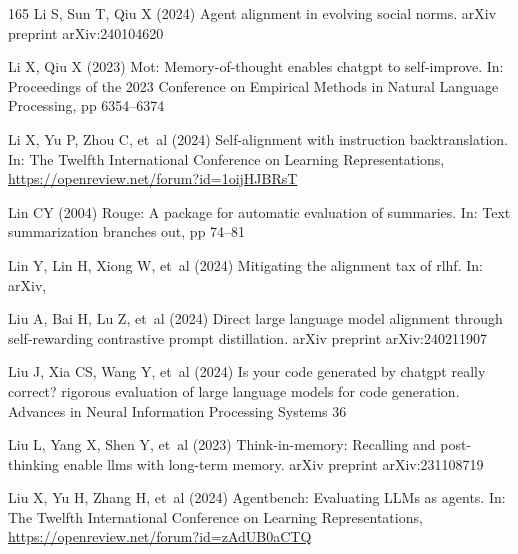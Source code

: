 \documentclass[sn-basic, Numbered]{sn-jnl}%
\theoremstyle{thmstyleone}%
\theoremstyle{thmstyletwo}%
\theoremstyle{thmstylethree}%
\begin{document}
\begin{thebibliography}{165}
Li S, Sun T, Qiu X (2024{}) Agent alignment in evolving social norms. arXiv preprint arXiv:240104620

Li X, Qiu X (2023) Mot: Memory-of-thought enables chatgpt to self-improve. In: Proceedings of the 2023 Conference on Empirical Methods in Natural Language Processing, pp 6354--6374

Li X, Yu P, Zhou C, et~al (2024{}) Self-alignment with instruction backtranslation. In: The Twelfth International Conference on Learning Representations, \urlprefix\url{https://openreview.net/forum?id=1oijHJBRsT}

Lin CY (2004) Rouge: A package for automatic evaluation of summaries. In: Text summarization branches out, pp 74--81

Lin Y, Lin H, Xiong W, et~al (2024) Mitigating the alignment tax of rlhf. In: arXiv, 

Liu A, Bai H, Lu Z, et~al (2024{}) Direct large language model alignment through self-rewarding contrastive prompt distillation. arXiv preprint arXiv:240211907

Liu J, Xia CS, Wang Y, et~al (2024{}) Is your code generated by chatgpt really correct? rigorous evaluation of large language models for code generation. Advances in Neural Information Processing Systems 36

Liu L, Yang X, Shen Y, et~al (2023) Think-in-memory: Recalling and post-thinking enable llms with long-term memory. arXiv preprint arXiv:231108719

Liu X, Yu H, Zhang H, et~al (2024{}) Agentbench: Evaluating {LLM}s as agents. In: The Twelfth International Conference on Learning Representations, \urlprefix\url{https://openreview.net/forum?id=zAdUB0aCTQ}


\end{thebibliography}
\end{document}
